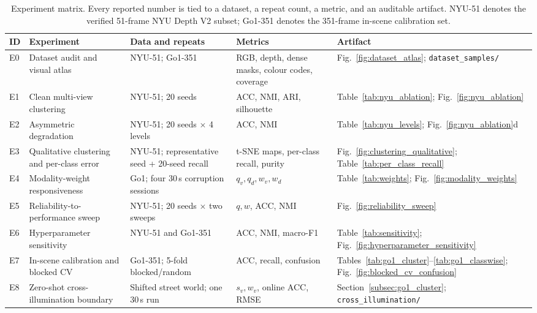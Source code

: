 \documentclass[11pt, a4paper]{article}
\begin{document}
\begin{table}[htbp]
    \centering
    \caption{Experiment matrix. Every reported number is tied to a dataset, a repeat count, a metric, and an auditable artifact. NYU-51 denotes the verified 51-frame NYU Depth V2 subset; Go1-351 denotes the 351-frame in-scene calibration set.}
    \label{tab:experiment_matrix}
    \scriptsize
    \setlength{\tabcolsep}{3.0pt}
    \renewcommand{\arraystretch}{1.05}
    \begin{tabularx}{\textwidth}{@{}l >{\raggedright\arraybackslash}p{3.05cm} >{\raggedright\arraybackslash}p{3.25cm} >{\raggedright\arraybackslash}p{3.35cm} >{\raggedright\arraybackslash}X@{}}
        \toprule
        \textbf{ID} & \textbf{Experiment} & \textbf{Data and repeats} & \textbf{Metrics} & \textbf{Artifact} \\
        \midrule
        E0 & Dataset audit and visual atlas & NYU-51; Go1-351 & RGB, depth, dense masks, colour codes, coverage & Fig.~\ref{fig:dataset_atlas}; \texttt{dataset\_samples/} \\
        E1 & Clean multi-view clustering & NYU-51; 20 seeds & ACC, NMI, ARI, silhouette & Table~\ref{tab:nyu_ablation}; Fig.~\ref{fig:nyu_ablation} \\
        E2 & Asymmetric degradation & NYU-51; 20 seeds $\times$ 4 levels & ACC, NMI & Table~\ref{tab:nyu_levels}; Fig.~\ref{fig:nyu_ablation}d \\
        E3 & Qualitative clustering and per-class error & NYU-51; representative seed + 20-seed recall & t-SNE maps, per-class recall, purity & Fig.~\ref{fig:clustering_qualitative}; Table~\ref{tab:per_class_recall} \\
        E4 & Modality-weight responsiveness & Go1; four 30\,s corruption sessions & $q_v,q_d,w_v,w_d$ & Table~\ref{tab:weights}; Fig.~\ref{fig:modality_weights} \\
        E5 & Reliability-to-performance sweep & NYU-51; 20 seeds $\times$ two sweeps & $q,w$, ACC, NMI & Fig.~\ref{fig:reliability_sweep} \\
        E6 & Hyperparameter sensitivity & NYU-51 and Go1-351 & ACC, NMI, macro-F1 & Table~\ref{tab:sensitivity}; Fig.~\ref{fig:hyperparameter_sensitivity} \\
        E7 & In-scene calibration and blocked CV & Go1-351; 5-fold blocked/random & ACC, recall, confusion & Tables~\ref{tab:go1_cluster}--\ref{tab:go1_classwise}; Fig.~\ref{fig:blocked_cv_confusion} \\
        E8 & Zero-shot cross-illumination boundary & Shifted street world; one 30\,s run & $s_v,w_v$, online ACC, RMSE & Section~\ref{subsec:go1_cluster}; \texttt{cross\_illumination/} \\

\end{tabularx}
\end{table}
\end{document}
